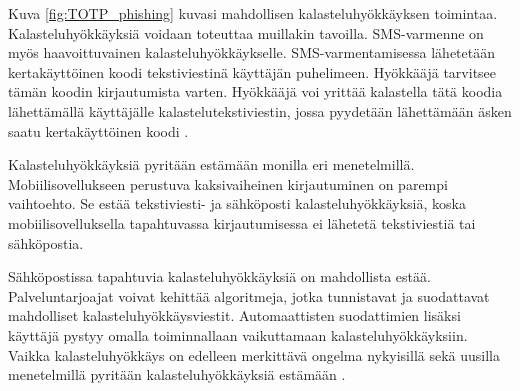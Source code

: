 Kuva \ref{fig:TOTP_phishing} kuvasi mahdollisen kalasteluhyökkäyksen toimintaa. Kalasteluhyökkäyksiä voidaan toteuttaa muillakin tavoilla. SMS-varmenne on myös haavoittuvainen kalasteluhyökkäykselle. SMS-varmentamisessa lähetetään kertakäyttöinen koodi tekstiviestinä käyttäjän puhelimeen. Hyökkääjä tarvitsee tämän koodin kirjautumista varten. Hyökkääjä voi yrittää kalastella tätä koodia lähettämällä käyttäjälle kalastelutekstiviestin, jossa pyydetään lähettämään äsken saatu kertakäyttöinen koodi \citep{google_transparency_report}.

Kalasteluhyökkäyksiä pyritään estämään monilla eri menetelmillä. Mobiilisovellukseen perustuva kaksivaiheinen kirjautuminen on parempi vaihtoehto. Se estää tekstiviesti- ja sähköposti kalasteluhyökkäyksiä, koska mobiilisovelluksella tapahtuvassa kirjautumisessa ei lähetetä tekstiviestiä tai sähköpostia.

Sähköpostissa tapahtuvia kalasteluhyökkäyksiä on mahdollista estää. Palveluntarjoajat voivat kehittää algoritmeja, jotka tunnistavat ja suodattavat mahdolliset kalasteluhyökkäysviestit. Automaattisten suodattimien lisäksi käyttäjä pystyy omalla toiminnallaan vaikuttamaan kalasteluhyökkäyksiin. Vaikka kalasteluhyökkäys on edelleen merkittävä ongelma nykyisillä sekä uusilla menetelmillä pyritään kalasteluhyökkäyksiä estämään \citep{google_transparency_report}.
